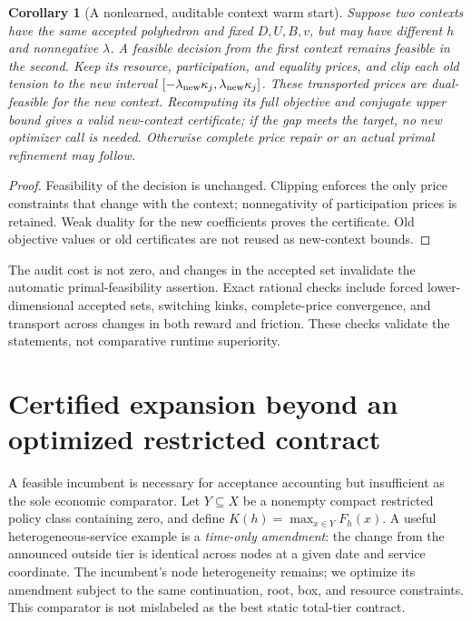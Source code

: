 \documentclass[11pt,letterpaper]{article}
\newtheorem{corollary}[theorem]{Corollary}
\theoremstyle{definition}
\newcommand{\1}{\mathbf 1}
\begin{document}
\begin{corollary}[A nonlearned, auditable context warm start]\label{cor:r22-transport}
Suppose two contexts have the same accepted polyhedron and fixed $D,U,B,v$, but may have different $h$ and nonnegative $\lambda$. A feasible decision from the first context remains feasible in the second. Keep its resource, participation, and equality prices, and clip each old tension to the new interval $[-\lambda_{\rm new}\kappa_j,\lambda_{\rm new}\kappa_j]$. These transported prices are dual-feasible for the new context. Recomputing its full objective and conjugate upper bound gives a valid new-context certificate; if the gap meets the target, no new optimizer call is needed. Otherwise complete price repair or an actual primal refinement may follow.
\end{corollary}
\begin{proof}
Feasibility of the decision is unchanged. Clipping enforces the only price constraints that change with the context; nonnegativity of participation prices is retained. Weak duality for the new coefficients proves the certificate. Old objective values or old certificates are not reused as new-context bounds.
\end{proof}
The audit cost is not zero, and changes in the accepted set invalidate the automatic primal-feasibility assertion. Exact rational checks include forced lower-dimensional accepted sets, switching kinks, complete-price convergence, and transport across changes in both reward and friction. These checks validate the statements, not comparative runtime superiority.

\section{Certified expansion beyond an optimized restricted contract}\label{sec:r22-benchmark}
A feasible incumbent is necessary for acceptance accounting but insufficient as the sole economic comparator. Let $Y\subseteq X$ be a nonempty compact restricted policy class containing zero, and define $K(h)=\max_{x\in Y}F_h(x)$. A useful heterogeneous-service example is a \emph{time-only amendment}: the change from the announced outside tier is identical across nodes at a given date and service coordinate. The incumbent's node heterogeneity remains; we optimize its amendment subject to the same continuation, root, box, and resource constraints. This comparator is not mislabeled as the best static total-tier contract.
\end{document}
